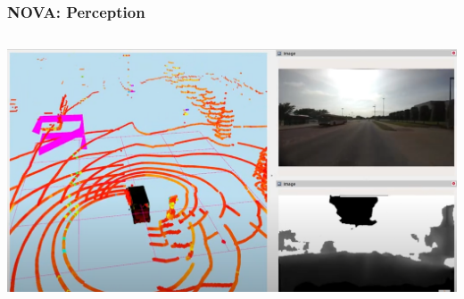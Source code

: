 \documentclass[aspectratio=169]{beamer}
\begin{document}
\begin{frame}
	\frametitle{NOVA: Perception \cite{nova}}
	\begin{columns}
		\begin{column}{0.7\textwidth}
			\includegraphics[width = \columnwidth]{figs/NOVA-sensorData_screenshot.png}
		\end{column}
	\end{columns}
\end{frame}
\end{document}
